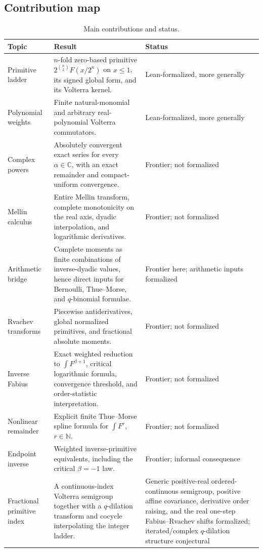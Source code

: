 \documentclass[11pt,oneside]{article}
\theoremstyle{definition}
\theoremstyle{remark}
\newcommand{\C}{\mathbb C}
\newcommand{\N}{\mathbb N}
\newcommand{\1}{\mathbf 1}
\begin{document}
\subsection{Contribution map}
\begin{table}[ht]
\centering
\small
\begin{tabularx}{\textwidth}{@{}p{}X p{}@{}}
\toprule
Topic & Result & Status \\
\midrule
Primitive ladder &
$n$-fold zero-based primitive $2^{\binom n2}F(x/2^n)$ on $x\le1$, its
signed global form, and its Volterra kernel. &
Lean-formalized, more generally \\
Polynomial weights &
Finite natural-monomial and arbitrary real-polynomial Volterra commutators. &
Lean-formalized, more generally \\
Complex powers &
Absolutely convergent exact series for every $\alpha\in\C$, with an exact
remainder and compact-uniform convergence. & Frontier; not formalized \\
Mellin calculus &
Entire Mellin transform, complete monotonicity on the real axis, dyadic
interpolation, and logarithmic derivatives. & Frontier; not formalized \\
Arithmetic bridge &
Complete moments as finite combinations of inverse-dyadic values, hence direct
inputs for Bernoulli, Thue--Morse, and $q$-binomial formulae. &
Frontier here; arithmetic inputs formalized \\
Rvachev transforms &
Piecewise antiderivatives, global normalized primitives, and fractional
absolute moments. & Frontier; not formalized \\
Inverse Fabius &
Exact weighted reduction to $\int F^{\beta+1}$, critical logarithmic formula,
convergence threshold, and order-statistic interpretation. &
Frontier; not formalized \\
Nonlinear remainder &
Explicit finite Thue--Morse spline formula for $\int F^r$, $r\in\N$. &
Frontier; not formalized \\
Endpoint inverse &
Weighted inverse-primitive equivalents, including the critical $\beta=-1$
law. & Frontier; informal consequence \\
Fractional primitive index &
A continuous-index Volterra semigroup together with a $q$-dilation transform and cocycle
interpolating the integer ladder. &
Generic positive-real ordered-continuous semigroup, positive affine covariance, derivative
order raising, and the real one-step Fabius--Rvachev shifts formalized; iterated/complex
$q$-dilation structure conjectural \\
\bottomrule
\end{tabularx}
\caption{Main contributions and status.}
\label{p2:tab:contribution-map}
\end{table}
\end{document}
